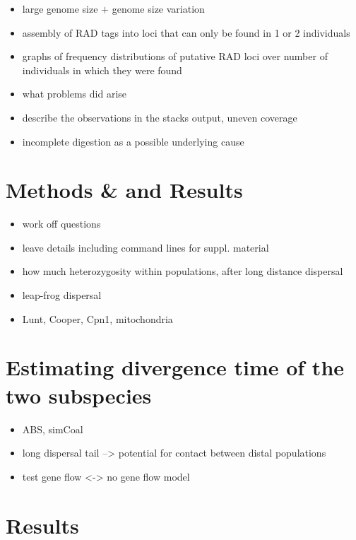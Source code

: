 \documentclass[a4paper,12pt,times,print,index, custombib]{PhDThesisPSnPDF}\usepackage[]{graphicx}\usepackage[]{color}
\begin{document}
\begin{itemize}
\item large genome size $+$ genome size variation
\item assembly of RAD tags into loci that can only be found in 1 or 2 individuals
\item graphs of frequency distributions of putative RAD loci over number of individuals in which they were found
\end{itemize}

\begin{itemize}
\item what problems did arise
\item describe the observations in the stacks output, uneven coverage
\item incomplete digestion as a possible underlying cause
\end{itemize}

\section{Methods \& and Results}

\begin{itemize}
\item work off questions
\item leave details including command lines for suppl. material
\item how much heterozygosity within populations, after long distance dispersal
\item leap-frog dispersal
\item Lunt, Cooper, Cpn1, mitochondria
\end{itemize}



\section{Estimating divergence time of the two subspecies}

\begin{itemize}
\item ABS, simCoal
\item long dispersal tail --> potential for contact between distal populations
\item test gene flow <-> no gene flow model
\end{itemize}


\section{Results}
\end{document}
